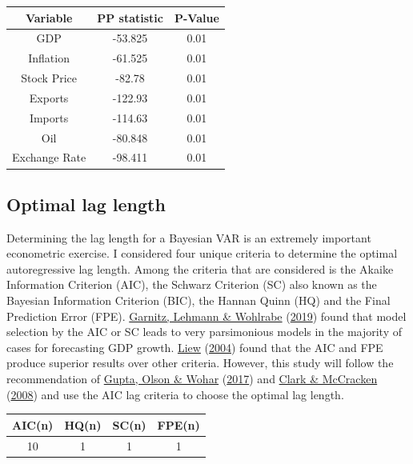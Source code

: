 \documentclass[11pt,preprint, authoryear]{elsarticle}
\let\origtable\table
\let\endorigtable\endtable
\renewenvironment{table}[1][2] {
    \expandafter\origtable\expandafter[H]
} {
    \endorigtable
}
\numberwithin{equation}{section}
\numberwithin{figure}{section}
\numberwithin{table}{section}
\begin{document}
\begin{table}
\begin{center}
\begin{tabular}{ |c|c|c| } 
 \hline
 Variable & PP statistic & P-Value \\ 
 \hline
 GDP & -53.825 & 0.01 \\ 
 Inflation & -61.525 & 0.01 \\
 Stock Price & -82.78 & 0.01 \\
 Exports & -122.93 & 0.01 \\
 Imports & -114.63 & 0.01 \\
 Oil & -80.848 & 0.01 \\
 Exchange Rate & -98.411 & 0.01 \\
 \hline
\end{tabular}
\caption{Phillips-Perron unit Root Test Analysis}
 \label{pptest}
\end{center}
\end{table}

\hypertarget{optimal-lag-length}{%
\subsection{Optimal lag length}\label{optimal-lag-length}}

Determining the lag length for a Bayesian VAR is an extremely important
econometric exercise. I considered four unique criteria to determine the
optimal autoregressive lag length. Among the criteria that are
considered is the Akaike Information Criterion (AIC), the Schwarz
Criterion (SC) also known as the Bayesian Information Criterion (BIC),
the Hannan Quinn (HQ) and the Final Prediction Error (FPE).
\protect\hyperlink{ref-garnitz}{Garnitz, Lehmann \& Wohlrabe}
(\protect\hyperlink{ref-garnitz}{2019}) found that model selection by
the AIC or SC leads to very parsimonious models in the majority of cases
for forecasting GDP growth. \protect\hyperlink{ref-liew}{Liew}
(\protect\hyperlink{ref-liew}{2004}) found that the AIC and FPE produce
superior results over other criteria. However, this study will follow
the recommendation of \protect\hyperlink{ref-gupta}{Gupta, Olson \&
Wohar} (\protect\hyperlink{ref-gupta}{2017}) and
\protect\hyperlink{ref-clark}{Clark \& McCracken}
(\protect\hyperlink{ref-clark}{2008}) and use the AIC lag criteria to
choose the optimal lag length.

\begin{table}
\begin{center}
\begin{tabular}{ |c|c|c|c| } 
 \hline
 AIC(n) & HQ(n) & SC(n) & FPE(n) \\ 
 \hline
 10 & 1 & 1 & 1\\ 
 \hline
\end{tabular}
\caption{lag length analysis}
 \label{lag}
\end{center}
\end{table}
\end{document}

